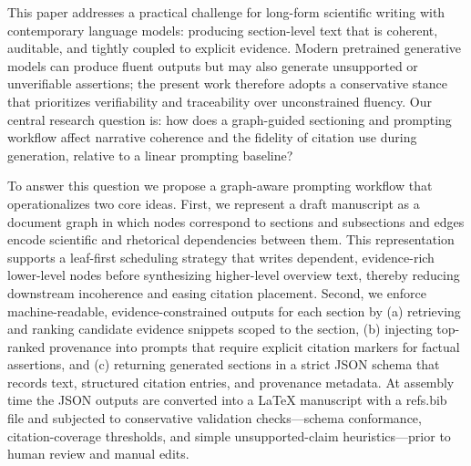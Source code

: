 This paper addresses a practical challenge for long-form scientific writing with contemporary language models: producing section-level text that is coherent, auditable, and tightly coupled to explicit evidence.
Modern pretrained generative models can produce fluent outputs but may also generate unsupported or unverifiable assertions; the present work therefore adopts a conservative stance that prioritizes verifiability and traceability over unconstrained fluency.
Our central research question is: how does a graph-guided sectioning and prompting workflow affect narrative coherence and the fidelity of citation use during generation, relative to a linear prompting baseline?

To answer this question we propose a graph-aware prompting workflow that operationalizes two core ideas.
First, we represent a draft manuscript as a document graph in which nodes correspond to sections and subsections and edges encode scientific and rhetorical dependencies between them.
This representation supports a leaf-first scheduling strategy that writes dependent, evidence-rich lower-level nodes before synthesizing higher-level overview text, thereby reducing downstream incoherence and easing citation placement.
Second, we enforce machine-readable, evidence-constrained outputs for each section by (a) retrieving and ranking candidate evidence snippets scoped to the section, (b) injecting top-ranked provenance into prompts that require explicit citation markers for factual assertions, and (c) returning generated sections in a strict JSON schema that records text, structured citation entries, and provenance metadata.
At assembly time the JSON outputs are converted into a LaTeX manuscript with a refs.bib file and subjected to conservative validation checks—schema conformance, citation-coverage thresholds, and simple unsupported-claim heuristics—prior to human review and manual edits.

